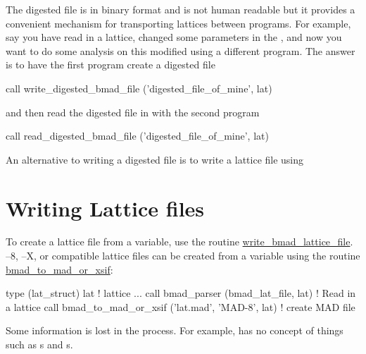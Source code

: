 The digested file is in binary format and is not human readable but it
provides a convenient mechanism for transporting lattices between
programs. For example, say you have read in a lattice, changed
some parameters in the , and now you want to do some
analysis on this modified  using a different program. The 
answer is to have the first program create a digested file
\begin{example}
  call write_digested_bmad_file ('digested_file_of_mine', lat)
\end{example}
and then read the digested file in with the second program
\begin{example}
  call read_digested_bmad_file ('digested_file_of_mine', lat)
\end{example}
An alternative to writing a digested file is to write a lattice file
using 

\section{Writing Lattice files}
\label{s:lat.write}

To create a \bmad lattice file from a  variable, use the routine
\hyperref[r:write.bmad.lattice.file]{write_bmad_lattice_file}.
\mad--8, \mad--X, or  compatible lattice 
files can be created from a  variable 
using the routine \hyperref[r:bmad.to.mad.or.xsif]{bmad_to_mad_or_xsif}:
\begin{example}
  type (lat_struct) lat             ! lattice
  ...
  call bmad_parser (bmad_lat_file, lat)               ! Read in a lattice
  call bmad_to_mad_or_xsif ('lat.mad', 'MAD-8', lat)  ! create MAD file
\end{example}
Some information is lost in the process. For example, \mad has no concept of 
things such as s and s.

